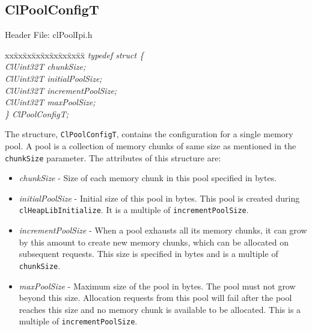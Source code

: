 \begin{flushleft}
\subsection{ClPoolConfigT}
\begin{Desc}
\item[Header File:]clPoolIpi.h\end{Desc}
\begin{tabbing}
xx\=xx\=xx\=xx\=xx\=xx\=xx\=xx\=xx\=\kill
\textit{typedef struct \{}\\
\>\>\>\>\textit{ClUint32T chunkSize;}\\
\>\>\>\>\textit{ClUint32T initialPoolSize;}\\
\>\>\>\>\textit{ClUint32T incrementPoolSize;}\\
\>\>\>\>\textit{ClUint32T maxPoolSize;}\\
\textit{\} ClPoolConfigT;}
\end{tabbing} The structure, {\tt{ClPoolConfigT}}, contains the configuration for a single
memory pool. A pool is a collection of memory chunks of same size as
mentioned in the {\tt{chunkSize}} parameter. The attributes of this structure are:
\begin{itemize}
\item \textit{chunkSize} - Size of each memory chunk in this pool specified in bytes.
\item \textit{initialPoolSize} - Initial size of this pool in bytes. This pool is created during {\tt{clHeapLibInitialize}}. It is a 
multiple of {\tt{incrementPoolSize}}.
\item \textit{incrementPoolSize} - 
When a pool exhausts all its memory chunks, it can grow by this amount to create new memory chunks, which can be allocated on subsequent requests. 
This size is specified in bytes and is a multiple of {\tt{chunkSize}}.
\item \textit{maxPoolSize} - Maximum size of the pool in bytes. The pool must not grow beyond this size. Allocation requests from this pool will fail
after the pool reaches this size and no memory chunk is available to be allocated. This is a multiple of {\tt{incrementPoolSize}}.
\end{itemize}



\end{flushleft}
